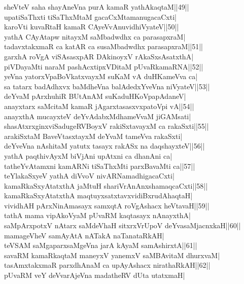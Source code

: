 \documentclass{article}
\begin{document}
sheVteV saha shayAneVna purA kamaR yathAkaqtaM||49||\\
upatiSaThxti tiSaThxMtaM gacaCxMtamanugacaCxti|\\
karoVti kuvaRtaH kamaR CAyeVvAnuvidhiVyateV||50||\\
yathA CAyAtapw nitayxM saMbadwdhx ca parasapxraM|\\
tadavxtakxmaR ca katAR ca susaMbadwdhx parasapxraM||51||\\
garxhA roVgA viSAsasxpAR DAkinoyxV rAkaSxsAsatxthA|\\
piVDayaMti naraM pashAcxtipxVDitaM pUvaRkamaRNA||52||\\
yeVna yatorxVpaBoVkatxvayxM suKaM vA duHKameVva ca|\\
sa tatarx badAdhxvx baMdheVna balAdedxYveVna niVyateV||53||\\
deYvaM pArxhuhiR BUtAnAM suKaduHKoVpapAdaneV|\\
anayxtarx saMcitaM kamaR jAgarxtasasxvxpatoVpi vA||54||\\
anayxthA mucayxteV deYvAdabxMdhameVvaM jiGAMsati|\\
shasAtxrxginxviSadugeRVBoyxV rakiSxtavayxM ca rakaSxti||55||\\
arakiSxtaM BaveVtasxtayxM deYvaM tameVva rakaSxti|\\
deYveVna nAshitaM yatutx tasayx rakASx na daqshayxteV||56||\\
yathA paqthivAyxM biVjAni upAtxni ca dhanAni ca|\\
tatheYvAtamxni kamARNi tiSaThxMti parxBavaMti ca||57||\\
teYlakaSxyeV yathA diVvoV nivARNamadhigacaCxti|\\
kamaRkaSxyAtatxthA jaMtuH shariVrAnAnxshamaqcaCxti||58||\\
kamaRkaSxyAtatxthA maqtuyxsatxtavxvidiBxrudAhaqtaH|\\
vividhAH pArxNinAmasayx samxqtA roVgAshacx heVtavaH||59||\\
tathA mama vipAkoVyaM pUvaRM kaqtasayx nAnayxthA|\\
saMpArxpotxV nAtarx saMdeVhaH sitxrxVrUpoV deYvasaMjacnxkaH||60||\\
mamageVheV samAyAtA nATakA naTanataRkAH|\\
teVSAM saMgaparxsaMgeVna jarA kAyaM samAshirxtA||61||\\
savaRM kamaRkaqtaM maneyxV yanemxV saMBAvitaM dhurxvaM|\\
tasAmxtakxmaR parxdhAnaM ca upAyAshacx nirathaRkAH||62||\\
pUvaRM veY deVvarAjeVna madatheRV dUta utatxmaH|\\
\end{document}
